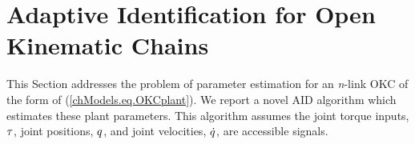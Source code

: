 \section{Adaptive Identification for Open Kinematic Chains }
\label{chSMS_ID.sec.OKC_AID}

This Section addresses the problem of parameter estimation for an {\it n}-link
\acf{OKC} of the form of (\ref{chModels.eq.OKCplant}). We report a
novel \ac{AID} algorithm  which estimates these plant parameters.
This algorithm assumes the joint torque inputs, $\tau$, joint
positions, $q$, and joint velocities, $\dot{q}$, are
accessible signals. 






